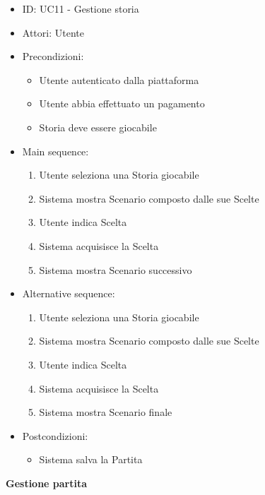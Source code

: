 \documentclass{article}
\begin{document}
\begin{itemize}[label = { }]
    \itemsep0px
    \item ID: UC11 - Gestione storia
    \item Attori: Utente
    \item Precondizioni: 
        \begin{itemize}[label = {-}]
            \item Utente autenticato dalla piattaforma
            \item Utente abbia effettuato un pagamento
            \item Storia deve essere giocabile
        \end{itemize}
    \item Main sequence: 
        \begin{enumerate}
            \item Utente seleziona una Storia giocabile
            \item Sistema mostra Scenario composto dalle sue Scelte
            \item Utente indica Scelta
            \item Sistema acquisisce la Scelta
            \item Sistema mostra Scenario successivo
        \end{enumerate}
    \item Alternative sequence:
        \begin{enumerate}
            \item Utente seleziona una Storia giocabile
            \item Sistema mostra Scenario composto dalle sue Scelte
            \item Utente indica Scelta
            \item Sistema acquisisce la Scelta
            \item Sistema mostra Scenario finale
        \end{enumerate}
    \item Postcondizioni: 
        \begin{itemize}[label = {-}]
            \item Sistema salva la Partita
        \end{itemize}
\end{itemize}
\textbf{Gestione partita}
\end{document}
